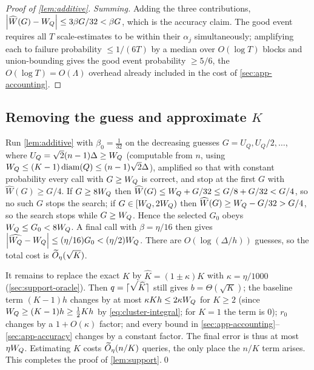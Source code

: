 \begin{proof}[Proof of \cref{lem:additive}]
\emph{Summing.} Adding the three contributions, $\left|\widehat W(G)-W_Q\right|\le 3\beta G/32<\beta G$, which is
the accuracy claim. The good event requires all $T$ scale-estimates to be within their $\alpha_j$
simultaneously; amplifying each to failure probability $\le 1/(6T)$ by a median over $O(\log T)$ blocks
and union-bounding gives the good event probability $\ge 5/6$, the $O(\log T)=O(\Lambda)$ overhead already
included in the cost of \cref{sec:app-accounting}.
\end{proof}

\subsection{Removing the guess and approximate \texorpdfstring{$K$}{K}}\label{sec:app-guess}

Run \cref{lem:additive} with $\beta_0=\tfrac1{32}$ on the decreasing guesses $G=U_Q,U_Q/2,\dots$, where
$U_Q=\sqrt2(n-1)\Delta\ge W_Q$ (computable from $n$, using $W_Q\le(K-1)\operatorname{diam}(Q)\le(n-1)\sqrt2\Delta$), amplified so that with constant probability every call with $G\ge W_Q$ is
correct, and stop at the first $G$ with $\widehat W(G)\ge G/4$. If $G\ge8W_Q$ then $\widehat W(G)\le
W_Q+G/32\le G/8+G/32<G/4$, so no such $G$ stops the search; if $G\in[W_Q,2W_Q)$ then $\widehat W(G)\ge
W_Q-G/32>G/4$, so the search stops while $G\ge W_Q$. Hence the selected $G_0$ obeys $W_Q\le G_0<8W_Q$. A
final call with $\beta=\eta/16$ then gives $\left|\widehat{W_Q}-W_Q\right|\le(\eta/16)G_0<(\eta/2)W_Q$. There are
$O(\log(\Delta/h))$ guesses, so the total cost is $\widetilde{O}_\eta(\sqrt K)$.

It remains to replace the exact $K$ by $\widehat K=(1\pm\kappa)K$ with $\kappa=\eta/1000$
(\cref{sec:support-oracle}). Then $q=\left\lceil \smash{\sqrt{\widehat K}} \right\rceil$ still gives $b=\Theta(\sqrt K)$; the
baseline term $(K-1)h$ changes by at most $\kappa K h\le 2\kappa W_Q$ for $K\ge2$ (since $W_Q\ge(K-1)h\ge
\tfrac12 Kh$ by \eqref{eq:cluster-integral}; for $K=1$ the term is $0$); $r_0$ changes by a $1+O(\kappa)$
factor; and every bound in
\cref{sec:app-accounting}--\cref{sec:app-accuracy} changes by a constant factor. The final error is thus
at most $\eta W_Q$. Estimating $K$ costs $\widetilde{O}_\eta(n/K)$ queries, the only place the $n/K$ term arises.
This completes the proof of \cref{lem:support}.\qed
